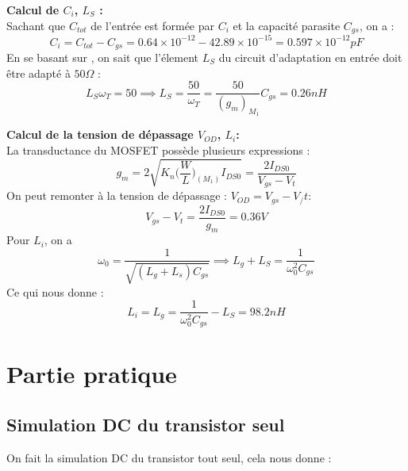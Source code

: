 \documentclass[a4paper]{article}
\begin{document}
\textbf{Calcul de $C_i$, $L_S$ :}\\
Sachant que $C_{tot}$ de l'entr\'ee est form\'ee par $C_i$ et la capacit\'e parasite $C_{gs}$, on a :
\[
  C_i = C_{tot} - C_{gs} = 0.64\times 10^{-12} - 42.89 \times 10^{-15} = 0.597 \times 10^{-12} pF
\]
En se basant sur \cite{RFIC-cours}, on sait que l'\'element $L_S$ du circuit d'adaptation en entr\'ee
doit \^etre adapt\'e \`a $50 \Omega$ :
\[
  L_S \omega_T = 50 \implies L_S = \frac{50}{\omega_T} = \frac{50}{(g_m)_{M_1}}C_{gs} = 0.26 nH
\]

\clearpage
\textbf{Calcul de la tension de d\'epassage $V_{OD}$, $L_i$:}\\
La transductance du MOSFET poss\`ede plusieurs expressions :
\[
  g_m = 2\sqrt{K_n \bigg( \frac{W}{L} \bigg)_{(M_1)} I_{DS0}} = \frac{2 I_{DS0}}{V_{gs} - V_{t}}
\]
On peut remonter \`a la tension de d\'epassage : $V_{OD} = V_{gs} - V_/{t}$:
\[
  V_{gs} - V_{t} = \frac{2 I_{DS0}}{g_m} = 0.36 V
\]
Pour $L_i$, on a
\[
  \omega_0 = \frac{1}{\sqrt{(L_g + L_s) C_{gs}}} \implies L_g + L_S = \frac{1}{\omega^2_0 C_{gs}}
\]
Ce qui nous donne :
\[
  L_i = L_g = \frac{1}{\omega^2_0 C_{gs}} - L_{S} = 98.2 nH
\]

\section{Partie pratique}
\subsection{Simulation DC du transistor seul}

On fait la simulation DC du transistor tout seul, cela nous donne :
\end{document}
